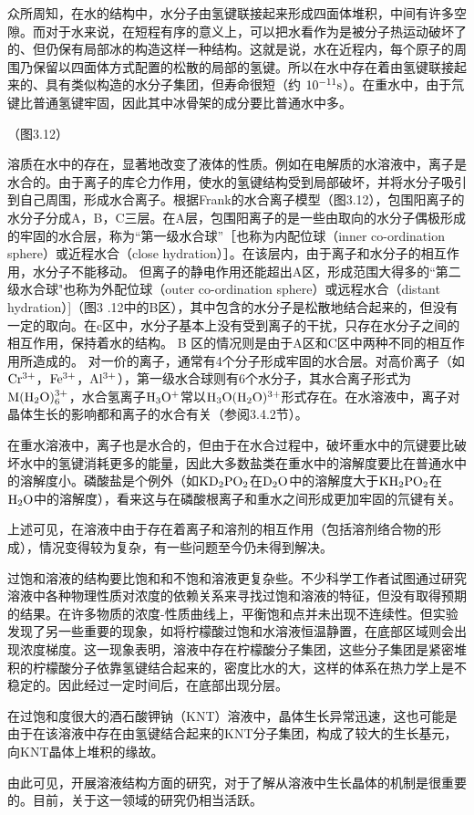 众所周知，在水的结构中，水分子由氢键联接起来形成四面体堆积，中间有许多空隙。而对于水来说，在短程有序的意义上，可以把水看作为是被分子热运动破坏了的、但仍保有局部冰的构造这样一种结构。这就是说，水在近程内，每个原子的周围乃保留以四面体方式配置的松散的局部的氢键。所以在水中存在着由氢键联接起来的、具有类似构造的水分子集团，但寿命很短（约 $\rm 10^{-11}s$）。在重水中，由于氘键比普通氢键牢固，因此其中冰骨架的成分要比普通水中多。

（图3.12）

溶质在水中的存在，显著地改变了液体的性质。例如在电解质的水溶液中，离子是水合的。由于离子的库仑力作用，使水的氢键结构受到局部破坏，并将水分子吸引到自己周围，形成水合离子。根据Frank的水合离子模型（图3.12），包围阳离子的水分子分成A，B，C三层。在A层，包围阳离子的是一些由取向的水分子偶极形成的牢固的水合层，称为“第一级水合球”［也称为内配位球（inner co-ordination sphere）或近程水合（close hydration）］。在该层内，由于离子和水分子的相互作用，水分子不能移动。 但离子的静电作用还能超出A区，形成范围大得多的“第二级水合球"也称为外配位球（outer co-ordination sphere）或远程水合（distant hydration）]（图3 .12中的B区），其中包含的水分子是松散地结合起来的，但没有一定的取向。在c区中，水分子基本上没有受到离子的干扰，只存在水分子之间的相互作用，保持着水的结构。 B 区的情况则是由于A区和C区中两种不同的相互作用所造成的。 对一价的离子，通常有4个分子形成牢固的水合层。对高价离子（如$\rm Cr^{3+}$，$\rm Fe^{3+}$，$\rm Al^{3+}$），第一级水合球则有6个水分子，其水合离子形式为$\rm M(H_2O)_6^{3+}$，水合氢离子$\rm H_3O^+$常以$\rm H_3O(H_2O)^{3+}$形式存在。在水溶液中，离子对晶体生长的影响都和离子的水合有关（参阅3.4.2节）。

在重水溶液中，离子也是水合的，但由于在水合过程中，破坏重水中的氘键要比破坏水中的氢键消耗更多的能量，因此大多数盐类在重水中的溶解度要比在普通水中的溶解度小。磷酸盐是个例外（如$\rm KD_2PO_2$在$\rm D_2O$中的溶解度大于$\rm KH_2PO_2$在$\rm H_2O$中的溶解度），看来这与在磷酸根离子和重水之间形成更加牢固的氘键有关。

上述可见，在溶液中由于存在着离子和溶剂的相互作用（包括溶剂络合物的形成），情况变得较为复杂，有一些问题至今仍未得到解决。

过饱和溶液的结构要比饱和和不饱和溶液更复杂些。不少科学工作者试图通过研究溶液中各种物理性质对浓度的依赖关系来寻找过饱和溶液的特征，但没有取得预期的结果。在许多物质的浓度-性质曲线上，平衡饱和点并未出现不连续性。但实验发现了另一些重要的现象，如将柠檬酸过饱和水溶液恒温静置，在底部区域则会出现浓度梯度。这一现象表明，溶液中存在柠檬酸分子集团，这些分子集团是紧密堆积的柠檬酸分子依靠氢键结合起来的，密度比水的大，这样的体系在热力学上是不稳定的。因此经过一定时间后，在底部出现分层。

在过饱和度很大的酒石酸钾钠（KNT）溶液中，晶体生长异常迅速，这也可能是由于在该溶液中存在由氢键结合起来的KNT分子集团，构成了较大的生长基元，向KNT晶体上堆积的缘故。 

由此可见，开展溶液结构方面的研究，对于了解从溶液中生长晶体的机制是很重要的。目前，关于这一领域的研究仍相当活跃。